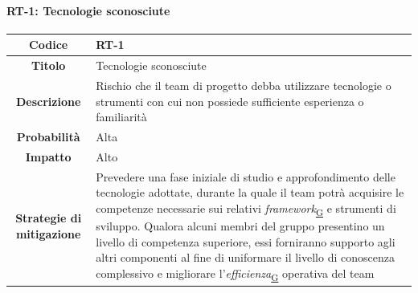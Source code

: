 \documentclass[a4paper,12pt]{article}
\begin{document}
{{            \paragraph{RT-1: Tecnologie sconosciute}\mbox{}{    
                \begin{longtable}{|c|p{11cm}|}
                    \hline
                    \textbf{Codice} & RT-1 \\
                    \hline
                    \textbf{Titolo} & Tecnologie sconosciute \\
                    \hline
                    \textbf{Descrizione} & Rischio che il team di progetto debba utilizzare tecnologie o strumenti con cui non possiede sufficiente esperienza o familiarità \\
                    \hline
                    \textbf{Probabilità} & Alta \\
                    \hline
                    \textbf{Impatto} & Alto \\
                    \hline
                    \textbf{Strategie di mitigazione} & Prevedere una fase iniziale di studio e approfondimento delle tecnologie adottate, durante la quale il team potrà 
                        acquisire le competenze necessarie sui relativi \textit{framework}\textsubscript{\href{https://atlasteam9.github.io/Atlas/glossario.html\#Framework}{G}} e strumenti di sviluppo. Qualora alcuni membri del gruppo presentino un livello di competenza superiore, essi forniranno supporto agli altri componenti al fine di uniformare il livello di conoscenza complessivo e migliorare l'\textit{efficienza}\textsubscript{\href{https://atlasteam9.github.io/Atlas/glossario.html\#Efficienza}{G}} operativa del team \\
                    \hline
                \end{longtable}
            }

}}
\end{document}
